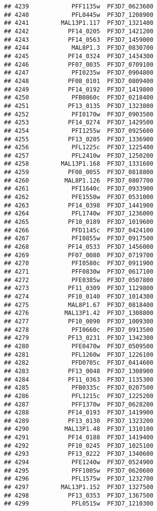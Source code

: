 \documentclass[12pt, a4paper]{article}\usepackage[]{graphicx}\usepackage[]{color}
\makeatletter
\newenvironment{kframe}{%
 \def\at@end@of@kframe{}%
 \ifinner\ifhmode%
  \def\at@end@of@kframe{\end{minipage}}%
  \begin{minipage}{\columnwidth}%
 \fi\fi%
 \def\FrameCommand##1{\hskip\@totalleftmargin \hskip-\fboxsep
 \colorbox{shadecolor}{##1}\hskip-\fboxsep
     \hskip-\linewidth \hskip-\@totalleftmargin \hskip\columnwidth}%
 \MakeFramed {\advance\hsize-\width
   \@totalleftmargin\z@ \linewidth\hsize
   \@setminipage}}%
 {\par\unskip\endMakeFramed%
 \at@end@of@kframe}
\newenvironment{knitrout}{}{} %
\makeatother
\begin{document}
\begin{knitrout}
\begin{kframe}
\begin{verbatim}
## 4239            PFF1135w  PF3D7_0623600
## 4240            PFL0445w  PF3D7_1208900
## 4241         MAL13P1.117  PF3D7_1321400
## 4242           PF14_0205  PF3D7_1421200
## 4243           PF14_0563  PF3D7_1459000
## 4244            MAL8P1.3  PF3D7_0830700
## 4245           PF14_0324  PF3D7_1434300
## 4246           PF07_0035  PF3D7_0709100
## 4247            PFI0235w  PF3D7_0904800
## 4248           PF08_0101  PF3D7_0809400
## 4249           PF14_0192  PF3D7_1419800
## 4250            PFB0860c  PF3D7_0218400
## 4251           PF13_0135  PF3D7_1323800
## 4252            PFI0170w  PF3D7_0903500
## 4253           PF14_0274  PF3D7_1429500
## 4254            PFI1255w  PF3D7_0925600
## 4255           PF13_0205  PF3D7_1336900
## 4256            PFL1225c  PF3D7_1225400
## 4257            PFL2410w  PF3D7_1250200
## 4258         MAL13P1.168  PF3D7_1331600
## 4259           PF08_0055  PF3D7_0818800
## 4260          MAL8P1.126  PF3D7_0807700
## 4261            PFI1640c  PF3D7_0933900
## 4262            PFE1550w  PF3D7_0531000
## 4263           PF14_0398  PF3D7_1441900
## 4264            PFL1740w  PF3D7_1236000
## 4265           PF10_0189  PF3D7_1019600
## 4266            PFD1145c  PF3D7_0424100
## 4267            PFI0855w  PF3D7_0917500
## 4268           PF14_0533  PF3D7_1456000
## 4269           PF07_0080  PF3D7_0719700
## 4270            PFI0580c  PF3D7_0911900
## 4271            PFF0830w  PF3D7_0617100
## 4272            PFE0385w  PF3D7_0507800
## 4273           PF11_0309  PF3D7_1129800
## 4274           PF10_0140  PF3D7_1014300
## 4275           MAL8P1.67  PF3D7_0818400
## 4276          MAL13P1.42  PF3D7_1308800
## 4277           PF10_0090  PF3D7_1009300
## 4278            PFI0660c  PF3D7_0913500
## 4279           PF13_0231  PF3D7_1342300
## 4280            PFE0470w  PF3D7_0509500
## 4281            PFL1260w  PF3D7_1226100
## 4282            PFD0705c  PF3D7_0414600
## 4283           PF13_0048  PF3D7_1308900
## 4284           PF11_0363  PF3D7_1135300
## 4285            PFB0335c  PF3D7_0207500
## 4286            PFL1215c  PF3D7_1225200
## 4287            PFF1370w  PF3D7_0628200
## 4288           PF14_0193  PF3D7_1419900
## 4289           PF13_0130  PF3D7_1323200
## 4290          MAL13P1.48  PF3D7_1310100
## 4291           PF14_0188  PF3D7_1419400
## 4292           PF10_0245  PF3D7_1025100
## 4293           PF13_0222  PF3D7_1340600
## 4294            PFE1240w  PF3D7_0524900
## 4295            PFF1005w  PF3D7_0620600
## 4296            PFL1575w  PF3D7_1232700
## 4297         MAL13P1.152  PF3D7_1327500
## 4298           PF13_0353  PF3D7_1367500
## 4299            PFL0515w  PF3D7_1210300

\end{verbatim}
\end{kframe}
\end{knitrout}
\end{document}
